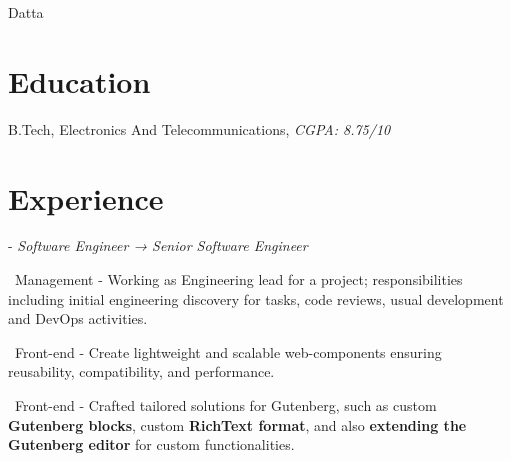 \documentclass[]{resume}
\begin{document}
     
  
 {Datta}\\\vspace{2pt}


%
%
\section{Education}
\raggedright

    \hspace*{\fill}  

    B.Tech, Electronics And Telecommunications, \textit{CGPA: 8.75/10}\hspace*{\fill}

    \sectionsep


       \section{Experience}
       \raggedright
         
            - \textit{Software Engineer → Senior Software Engineer}\hspace*{\fill}  

            \textbullet\ Management - Working as Engineering lead for a project; responsibilities including initial engineering discovery for tasks, code reviews, usual development and DevOps activities.

            \textbullet\ Front-end - Create lightweight and scalable web-components ensuring reusability, compatibility, and performance. 

            \textbullet\ Front-end - Crafted tailored solutions for Gutenberg, such as custom \textbf{Gutenberg blocks}, custom \textbf{RichText format}, and also \textbf{extending the Gutenberg editor} for custom functionalities.
\end{document}

